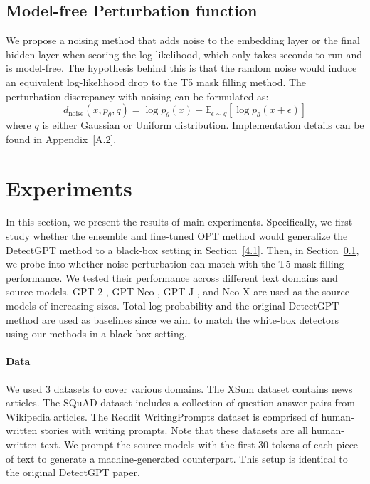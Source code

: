 \documentclass[11pt]{article}
\begin{document}
\subsection{Model-free Perturbation function} \label{4.2}
We propose a noising method that adds noise to the embedding layer or the final hidden layer when scoring the log-likelihood, which only takes seconds to run and is model-free. The hypothesis behind this is that the random noise would induce an equivalent log-likelihood drop to the T5 mask filling method. The perturbation discrepancy with noising can be formulated as:
\begin{equation}
    d_{\text{noise}}(x, p_\theta, q) = \log p_\theta(x) - \mathbb{E}_{\epsilon\sim q}[\log p_\theta(x + \epsilon)]
\end{equation}
where $q$ is either Gaussian or Uniform distribution. Implementation details can be found in Appendix~\ref{A.2}.

\section{Experiments}
In this section, we present the results of main experiments. Specifically, we first study whether the ensemble and fine-tuned OPT method would generalize the DetectGPT method to a black-box setting in Section~\ref{4.1}. Then, in Section~\ref{4.2}, we probe into whether noise perturbation can match with the T5 mask filling performance. We tested their performance across different text domains and source models. GPT-2 \cite{Radford2019LanguageMA}, GPT-Neo \cite{Black2021GPTNeoLS}, GPT-J \cite{mesh-transformer-jax}, and Neo-X \cite{Black2022GPTNeoX20BAO} are used as the source models of increasing sizes. Total log probability \citep{Solaiman2019ReleaseSA} and the original DetectGPT method are used as baselines since we aim to match the white-box detectors using our methods in a black-box setting.

\paragraph{Data}
We used 3 datasets to cover various domains. The XSum dataset \cite{narayan2018dont} contains news articles. The SQuAD dataset \cite{rajpurkar-etal-2016-squad} includes a collection of question-answer pairs from Wikipedia articles. The Reddit WritingPrompts dataset \cite{fan-etal-2018-hierarchical} is comprised of human-written stories with writing prompts. Note that these datasets are all human-written text. We prompt the source models with the first 30 tokens of each piece of text to generate a machine-generated counterpart. This setup is identical to the original DetectGPT paper.
\end{document}
